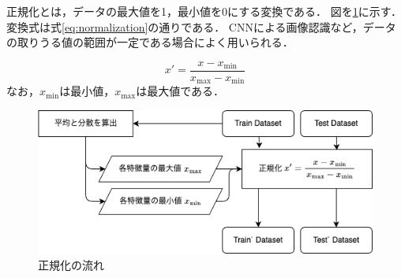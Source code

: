 正規化とは，データの最大値を1，最小値を0にする変換である．
図を\ref{fig:normalization}に示す．
変換式は式\ref{eq:normalization}の通りである．
CNNによる画像認識など，データの取りうる値の範囲が一定である場合によく用いられる．

\begin{equation}
  \label{eq:normalization}
  x' = \frac{x - x_{\min}}{x_{\max} - x_{\min}}
\end{equation}
なお，$x_{\min}$は最小値，$x_{\max}$は最大値である．

\begin{figure}[htbp]
  \centering
  \includegraphics[width=0.6\linewidth]{figures/normalization.png}
  \caption{正規化の流れ}
  \label{fig:normalization}
\end{figure}
